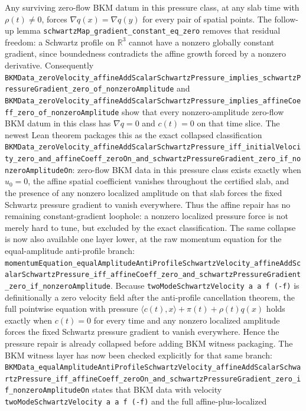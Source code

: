 \documentclass[11pt]{article}
\begin{document}
Any surviving zero-flow BKM datum in this pressure class, at any slab time with
\(\rho(t)\neq0\), forces \(\nabla q(x)=\nabla q(y)\) for every pair of spatial
points.  The follow-up lemma
\texttt{schwartzMap\_gradient\_constant\_eq\_zero} removes that residual
freedom: a Schwartz profile on \(\mathbb R^3\) cannot have a nonzero globally
constant gradient, since boundedness contradicts the affine growth forced by a
nonzero derivative.  Consequently
\texttt{BKMData\_zeroVelocity\_affineAddScalarSchwartzPressure\_implies\_schwartzPressureGradient\_zero\_of\_nonzeroAmplitude}
and
\texttt{BKMData\_zeroVelocity\_affineAddScalarSchwartzPressure\_implies\_affineCoeff\_zero\_of\_nonzeroAmplitude}
show that every nonzero-amplitude zero-flow BKM datum in this class has
\(\nabla q=0\) and \(c(t)=0\) on that time slice.
The newest Lean theorem packages this as the exact collapsed classification
\texttt{BKMData\_zeroVelocity\_affineAddScalarSchwartzPressure\_iff\_initialVelocity\_zero\_and\_affineCoeff\_zeroOn\_and\_schwartzPressureGradient\_zero\_if\_nonzeroAmplitudeOn}:
zero-flow BKM data in this pressure class exists exactly when \(u_0=0\), the
affine spatial coefficient vanishes throughout the certified slab, and the
presence of any nonzero localized amplitude on that slab forces the fixed
Schwartz pressure gradient to vanish everywhere.  Thus the affine repair has
no remaining constant-gradient loophole: a nonzero localized pressure force is
not merely hard to tune, but excluded by the exact classification.
The same collapse is now also available one layer lower, at the raw momentum
equation for the equal-amplitude anti-profile branch:
\texttt{momentumEquation\_equalAmplitudeAntiProfileSchwartzVelocity\_affineAddScalarSchwartzPressure\_iff\_affineCoeff\_zero\_and\_schwartzPressureGradient\_zero\_if\_nonzeroAmplitude}.
Because \texttt{twoModeSchwartzVelocity a a f (-f)} is definitionally a
zero velocity field after the anti-profile cancellation theorem, the full
pointwise equation with pressure
\(\langle c(t),x\rangle+\pi(t)+\rho(t)q(x)\) holds exactly when \(c(t)=0\)
for every time and any nonzero localized amplitude forces the fixed Schwartz
pressure gradient to vanish everywhere.  Hence the pressure repair is already
collapsed before adding BKM witness packaging.
The BKM witness layer has now been checked explicitly for that same branch:
\texttt{BKMData\_equalAmplitudeAntiProfileSchwartzVelocity\_affineAddScalarSchwartzPressure\_iff\_affineCoeff\_zeroOn\_and\_schwartzPressureGradient\_zero\_if\_nonzeroAmplitudeOn}
states that BKM data with velocity
\texttt{twoModeSchwartzVelocity a a f (-f)} and the full affine-plus-localized
\end{document}
